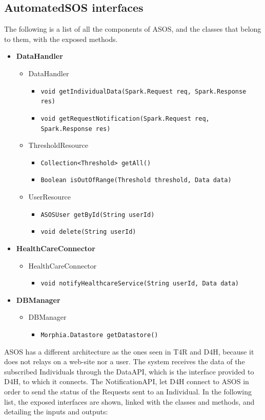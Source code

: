 \documentclass[a4paper, hidelinks, 12pt]{report}
\begin{document}
	\subsection{AutomatedSOS interfaces}
	The following is a list of all the components of ASOS, and the classes that belong to them, with the exposed methods.
	\begin{itemize}
		\item{\textbf{DataHandler}}
			\begin{itemize}
				\item{DataHandler}
					\begin{itemize}
						\item{\verb|void getIndividualData(Spark.Request req, Spark.Response res)|}
						\item{\verb|void getRequestNotification(Spark.Request req, Spark.Response res)|}
					\end{itemize}
					\item{ThresholdResource}
					\begin{itemize}
						\item{\verb|Collection<Threshold> getAll()|}
						\item{\verb|Boolean isOutOfRange(Threshold threshold, Data data)|}
					\end{itemize}
					\item{UserResource}
					\begin{itemize}
						\item{\verb|ASOSUser getById(String userId)|}
						\item{\verb|void delete(String userId)|}
					\end{itemize}
			\end{itemize}
		\item{\textbf{HealthCareConnector}}
			\begin{itemize}
				\item{HealthCareConnector}
					\begin{itemize}
						\item{\verb|void notifyHealthcareService(String userId, Data data)|}
					\end{itemize}
			\end{itemize}
		\item{\textbf{DBManager}}
			\begin{itemize}
				\item{DBManager}
					\begin{itemize}
						\item{\verb|Morphia.Datastore getDatastore()|}
					\end{itemize}
			\end{itemize}
	\end{itemize}
	ASOS has a different architecture as the ones seen in T4R and D4H, because it does not relays on a web-site nor a user. The system receives the data of the subscribed Individuals through the DataAPI, which is the interface provided to D4H, to which it connects. The NotificationAPI, let D4H connect to ASOS in order to send the status of the Requests sent to an Individual.  In the following list, the exposed interfaces are shown, linked with the classes and methods, and detailing the inputs and outputs:
	
\end{document}
